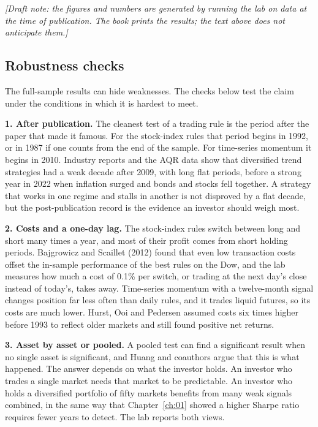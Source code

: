 \emph{[Draft note: the figures and numbers are generated by running the lab on data at the time of publication. The book prints the results; the text above does not anticipate them.]}

\subsection{Robustness checks}
\label{sec:08-stress}

The full-sample results can hide weaknesses. The checks below test the claim under the conditions in which it is hardest to meet.

\textbf{1. After publication.} The cleanest test of a trading rule is the period after the paper that made it famous. For the stock-index rules that period begins in 1992, or in 1987 if one counts from the end of the sample. For time-series momentum it begins in 2010. Industry reports and the AQR data show that diversified trend strategies had a weak decade after 2009, with long flat periods, before a strong year in 2022 when inflation surged and bonds and stocks fell together. A strategy that works in one regime and stalls in another is not disproved by a flat decade, but the post-publication record is the evidence an investor should weigh most.

\textbf{2. Costs and a one-day lag.} The stock-index rules switch between long and short many times a year, and most of their profit comes from short holding periods. Bajgrowicz and Scaillet (2012) found that even low transaction costs offset the in-sample performance of the best rules on the Dow, and the lab measures how much a cost of 0.1\% per switch, or trading at the next day's close instead of today's, takes away. Time-series momentum with a twelve-month signal changes position far less often than daily rules, and it trades liquid futures, so its costs are much lower. Hurst, Ooi and Pedersen assumed costs six times higher before 1993 to reflect older markets and still found positive net returns.

\textbf{3. Asset by asset or pooled.} A pooled test can find a significant result when no single asset is significant, and Huang and coauthors argue that this is what happened. The answer depends on what the investor holds. An investor who trades a single market needs that market to be predictable. An investor who holds a diversified portfolio of fifty markets benefits from many weak signals combined, in the same way that Chapter~\ref{ch:01} showed a higher Sharpe ratio requires fewer years to detect. The lab reports both views.

